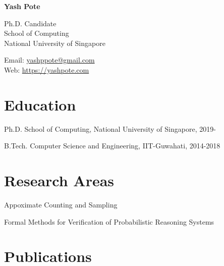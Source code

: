 \documentclass[12pt,letterpaper]{report}
\newcommand{\myname}{Yash Pote}
\newcommand{\namefont}[1]{{\normalfont\bfseries\Huge{#1}}}
\newcommand{\listitemspace}{0.15em}
\renewenvironment{itemize}
{\begin{list}{}{\setlength{\leftmargin}{0em}
            \setlength{\parskip}{0em}
            \setlength{\itemsep}{\listitemspace}
            \setlength{\parsep}{\listitemspace}}}
    {\end{list}}
\begin{document}
    \raggedright

    \namefont{\myname}

    \vspace{1em}
    \begin{minipage}[t]{0.68\textwidth}
    	Ph.D. Candidate \\
        School of Computing \\
		National University of Singapore
    \end{minipage}
    \begin{minipage}[t]{0.31\textwidth}
        Email: \href{mailto:yashppote@gmail.com}{yashppote@gmail.com} \\
        Web: \href{https://yashpote.com}{https://yashpote.com}
    \end{minipage}
    \vspace{0.5em}



    \section*{Education}

    \begin{tablist}

        \item[Ph.D.] \tab School of Computing, National University of Singapore, 2019-

        \item[B.Tech.]  \tab Computer Science and Engineering, IIT-Guwahati, 2014-2018

    \end{tablist}


    \section*{Research Areas}

    \begin{itemize}

		\item Appoximate Counting and Sampling
		\item Formal Methods for Verification of Probabilistic Reasoning Systems 

    \end{itemize}



    \section*{Publications}
\end{document}
